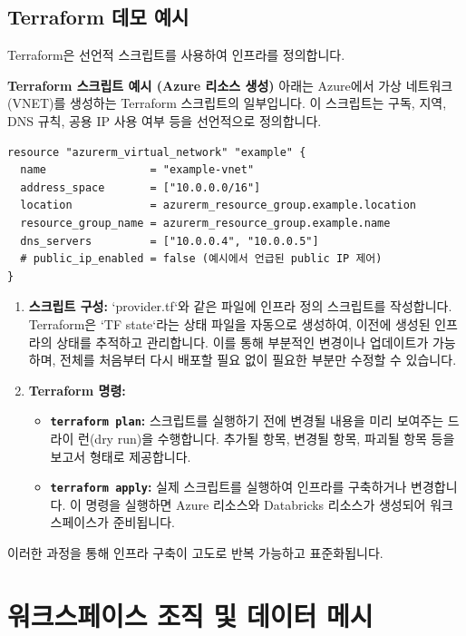 \documentclass[11pt,a4paper]{article}
\begin{document}
\subsection{Terraform 데모 예시}
Terraform은 선언적 스크립트를 사용하여 인프라를 정의합니다.

\begin{examplebox}
\textbf{Terraform 스크립트 예시 (Azure 리소스 생성)}
아래는 Azure에서 가상 네트워크(VNET)를 생성하는 Terraform 스크립트의 일부입니다. 이 스크립트는 구독, 지역, DNS 규칙, 공용 IP 사용 여부 등을 선언적으로 정의합니다.

\begin{lstlisting}[language=HCL, caption={Terraform Azure VNET 생성 예시}, label={lst:terraform_azure_vnet}]
resource "azurerm_virtual_network" "example" {
  name                = "example-vnet"
  address_space       = ["10.0.0.0/16"]
  location            = azurerm_resource_group.example.location
  resource_group_name = azurerm_resource_group.example.name
  dns_servers         = ["10.0.0.4", "10.0.0.5"]
  # public_ip_enabled = false (예시에서 언급된 public IP 제어)
}
\end{lstlisting}
\end{examplebox}

\begin{enumerate}
    \item \textbf{스크립트 구성:}
    `provider.tf`와 같은 파일에 인프라 정의 스크립트를 작성합니다. Terraform은 `TF state`라는 상태 파일을 자동으로 생성하여, 이전에 생성된 인프라의 상태를 추적하고 관리합니다. 이를 통해 부분적인 변경이나 업데이트가 가능하며, 전체를 처음부터 다시 배포할 필요 없이 필요한 부분만 수정할 수 있습니다.

    \item \textbf{Terraform 명령:}
    \begin{itemize}
        \item \textbf{\texttt{terraform plan}:} 스크립트를 실행하기 전에 변경될 내용을 미리 보여주는 드라이 런(dry run)을 수행합니다. 추가될 항목, 변경될 항목, 파괴될 항목 등을 보고서 형태로 제공합니다.
        \item \textbf{\texttt{terraform apply}:} 실제 스크립트를 실행하여 인프라를 구축하거나 변경합니다. 이 명령을 실행하면 Azure 리소스와 Databricks 리소스가 생성되어 워크스페이스가 준비됩니다.
    \end{itemize}
\end{enumerate}
이러한 과정을 통해 인프라 구축이 고도로 반복 가능하고 표준화됩니다.

\newpage
\section{워크스페이스 조직 및 데이터 메시}
\end{document}
